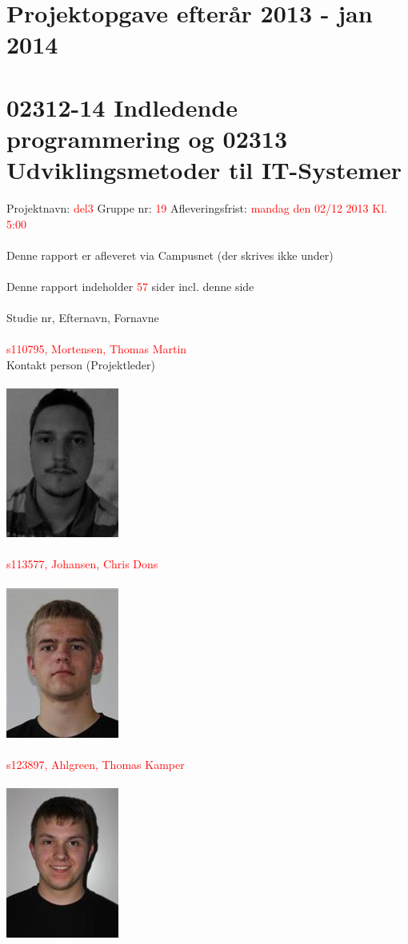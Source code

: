 \documentclass{article}
\begin{document}
\section*{Projektopgave efterår 2013 - jan 2014}
\section*{02312-14 Indledende programmering og 02313 Udviklingsmetoder til IT-Systemer}
Projektnavn: \textcolor{red}{del3}
Gruppe nr: \textcolor{red}{19}
Afleveringsfrist: \textcolor{red}{mandag den 02/12 2013 Kl. 5:00}
\\\\
Denne rapport er afleveret via Campusnet (der skrives ikke under)
\\\\
Denne rapport indeholder \textcolor{red}{57} sider incl. denne side
\\\\
Studie nr, Efternavn, Fornavne
\\\\
\textcolor{red}{s110795, Mortensen, Thomas Martin}
\\
Kontakt person (Projektleder)
\\\\
\includegraphics[scale=0.5]{ThomasM.jpg}
\\\\
\textcolor{red}{s113577, Johansen, Chris Dons}
\\\\
\includegraphics[scale=0.5]{ChrisJ.jpg}
\\\\
\textcolor{red}{s123897, Ahlgreen, Thomas Kamper}
\\\\
\includegraphics[scale=0.5]{ThomasA.jpg}
\newpage
\end{document}

